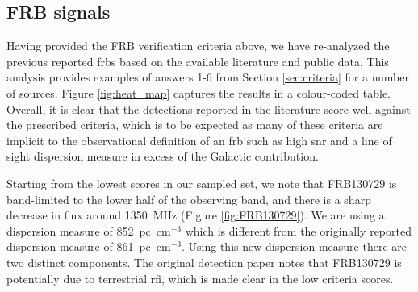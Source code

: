 \documentclass[a4paper,fleqn,usenatbib]{mnras}
\begin{document}
\subsection{FRB signals}
\label{sec:frb_signals}

Having provided the FRB verification criteria above, we have re-analyzed the
previous reported \glspl{frb} based on the available literature and public data.
This analysis provides examples of answers 1-6 from Section \ref{sec:criteria}
for a number of sources. Figure \ref{fig:heat_map} captures the results in a
colour-coded table.  Overall, it is clear that the detections reported in the
literature score well against the prescribed criteria, which is to be expected
as many of these criteria are implicit to the observational definition of an
\gls{frb} such as high \gls{snr} and a line of sight dispersion measure in
excess of the Galactic contribution.

Starting from the lowest scores in our sampled set, we note that FRB130729 is
band-limited to the lower half of the observing band, and there is a sharp
decrease in flux around 1350~MHz (Figure \ref{fig:FRB130729}). We are using a
dispersion measure of 852~pc~cm$^{-3}$ which is different from the originally
reported dispersion measure of 861~pc~cm$^{-3}$. Using this new dispersion
measure there are two distinct components. The original detection paper
\citep{2016MNRAS.460L..30C} notes that FRB130729 is potentially due to
terrestrial \gls{rfi}, which is made clear in the low criteria scores.
\end{document}
